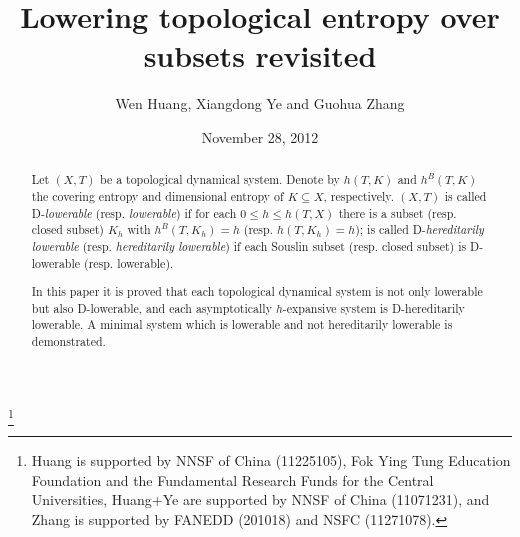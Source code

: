 \documentclass[12pt]{amsart}
\theoremstyle{definition} \theoremstyle{question}
\numberwithin{equation}{section}
\begin{document}
\title{Lowering topological entropy over subsets revisited}

\date{November 28, 2012}

\author{Wen Huang, Xiangdong Ye and Guohua Zhang}

\address{Wu Wen-Tsun Key Laboratory of Mathematics, USTC, Chinese Academy of Sciences and
Department of Mathematics, University of Science and Technology of
China, Hefei, Anhui, 230026, P.R. China}


\address{School of Mathematical Sciences and LMNS, Fudan University, Shanghai 200433, China}



\thanks{Huang is supported by NNSF of China (11225105), Fok Ying Tung Education Foundation and
the Fundamental Research Funds for the Central Universities,
Huang+Ye are supported by NNSF of China (11071231), and Zhang is
supported by FANEDD (201018) and NSFC (11271078).}

\begin{abstract}
Let $(X, T)$ be a topological dynamical system. Denote by $h (T, K)$
and $h^B (T, K)$ the covering entropy and dimensional entropy of
$K\subseteq X$, respectively.  $(X, T)$ is called D-{\it lowerable}
(resp. {\it lowerable}) if for each $0\le h\le h (T, X)$ there is a
subset (resp. closed subset) $K_h$ with $h^B (T, K_h)= h$ (resp. $h
(T, K_h)= h$); is called D-{\it hereditarily lowerable} (resp. {\it
hereditarily lowerable}) if each Souslin subset (resp. closed
subset) is D-lowerable (resp. lowerable).

In this paper it is proved that each topological dynamical system is
not only lowerable but also D-lowerable, and each asymptotically
$h$-expansive system is D-hereditarily lowerable. A minimal system
which is lowerable and not hereditarily lowerable is demonstrated.

\end{abstract}

\maketitle

\end{document}
